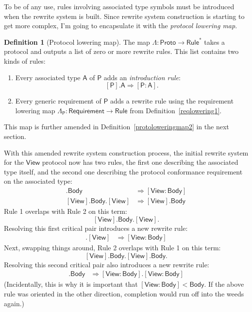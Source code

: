 \documentclass[a4paper,headsepline,bibliography=totoc,toc=flat,fleqn,twoside=semi]{scrbook}
\theoremstyle{definition}
\newtheorem{definition}{Definition}[chapter]
\theoremstyle{definition}
\theoremstyle{definition}
\newcommand{\namesym}[1]{\mathsf{#1}}
\newcommand{\proto}[1]{\bm{\mathsf{#1}}}
\newcommand{\protosym}[1]{[\proto{#1}]}
\newcommand{\assocsym}[2]{[\proto{#1}\colon\namesym{#2}]}
\begin{document}
To be of any use, rules involving associated type symbols must be introduced when the rewrite system is built. Since rewrite system construction is starting to get more complex, I'm going to encapsulate it with the \emph{protocol lowering map}.
\begin{definition}[Protocol lowering map]\label{protoloweringmap}
The map $\Lambda\colon\namesym{Proto}\rightarrow\namesym{Rule}^*$ takes a protocol and outputs a list of zero or more rewrite rules. This list contains two kinds of rules:
\begin{enumerate}
\item Every associated type $\namesym{A}$ of $\proto{P}$ adds an \emph{introduction rule}:
\[\protosym{P}.\namesym{A}\Rightarrow\assocsym{P}{A}.\]
\item Every generic requirement of $\proto{P}$ adds a rewrite rule using the requirement lowering map $\Lambda_{\proto{P}}:\namesym{Requirement}\rightarrow\namesym{Rule}$ from Definition~\ref{reqlowering1}.
\end{enumerate}
This map is further amended in Definition~\ref{protoloweringmap2} in the next section.
\end{definition}
With this amended rewrite system construction process, the initial rewrite system for the $\proto{View}$ protocol now has two rules, the first one describing the associated type itself, and the second one describing the protocol conformance requirement on the associated type:
\begin{align}
\protosym{View}.\namesym{Body}&\Rightarrow\assocsym{View}{Body}\tag{1}\\
\protosym{View}.\namesym{Body}.\protosym{View}&\Rightarrow\protosym{View}.\namesym{Body}\tag{2}
\end{align}
Rule 1 overlaps with Rule 2 on this term:
\[\protosym{View}.\namesym{Body}.\protosym{View}.\]
Resolving this first critical pair introduces a new rewrite rule:
\begin{align}
\assocsym{View}{Body}.\protosym{View}&\Rightarrow\assocsym{View}{Body}\tag{3}
\end{align}
Next, swapping things around, Rule 2 overlaps with Rule 1 on this term:
\[\protosym{View}.\namesym{Body}.\protosym{View}.\namesym{Body}.\]
Resolving this second critical pair also introduces a new rewrite rule:
\begin{align}
\assocsym{View}{Body}.\namesym{Body}&\Rightarrow\assocsym{View}{Body}.\assocsym{View}{Body}\tag{4}
\end{align}
(Incidentally, this is why it is important that $\assocsym{View}{Body}<\namesym{Body}$. If the above rule was oriented in the other direction, completion would run off into the weeds again.)
\end{document}

